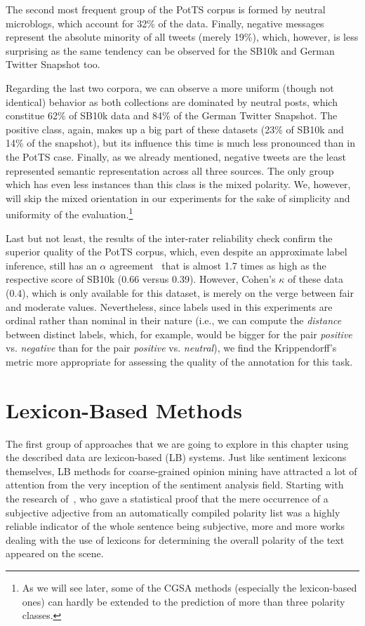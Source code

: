 The second most frequent group of the PotTS corpus is formed by
neutral microblogs, which account for 32\% of the data.  Finally,
negative messages represent the absolute minority of all tweets
(merely 19\%), which, however, is less surprising as the same tendency
can be observed for the SB10k and German Twitter Snapshot too.

Regarding the last two corpora, we can observe a more uniform (though
not identical) behavior as both collections are dominated by neutral
posts, which constitue 62\% of SB10k data and 84\% of the German
Twitter Snapshot.  The positive class, again, makes up a big part of
these datasets (23\% of SB10k and 14\% of the snapshot), but its
influence this time is much less pronounced than in the PotTS case.
Finally, as we already mentioned, negative tweets are the least
represented semantic representation across all three sources.  The
only group which has even less instances than this class is the mixed
polarity.  We, however, will skip the mixed orientation in our
experiments for the sake of simplicity and uniformity of the
evaluation.\footnote{As we will see later, some of the CGSA methods
  (especially the lexicon-based ones) can hardly be extended to the
  prediction of more than three polarity classes.}

Last but not least, the results of the inter-rater reliability check
confirm the superior quality of the PotTS corpus, which, even despite
an approximate label inference, still has an $\alpha$
agreement~\cite{Krippendorff:07} that is almost 1.7 times as high as
the respective score of SB10k (0.66 versus 0.39).  However, Cohen's
$\kappa$ of these data (0.4), which is only available for this
dataset, is merely on the verge between fair and moderate values.
Nevertheless, since labels used in this experiments are ordinal rather
than nominal in their nature (i.e., we can compute the \emph{distance}
between distinct labels, which, for example, would be bigger for the
pair \emph{positive} vs. \emph{negative} than for the pair
\emph{positive} vs. \emph{neutral}), we find the Krippendorff's metric
more appropriate for assessing the quality of the annotation for this
task.

\section{Lexicon-Based Methods}\label{sec:cgsa:lexicon-based}

The first group of approaches that we are going to explore in this
chapter using the described data are lexicon-based (LB) systems.  Just
like sentiment lexicons themselves, LB methods for coarse-grained
opinion mining have attracted a lot of attention from the very
inception of the sentiment analysis field.  Starting with the research
of~\citet{Hatzivassi:00}, who gave a statistical proof that the mere
occurrence of a subjective adjective from an automatically compiled
polarity list was a highly reliable indicator of the whole sentence
being subjective, more and more works dealing with the use of lexicons
for determining the overall polarity of the text appeared on the
scene.

